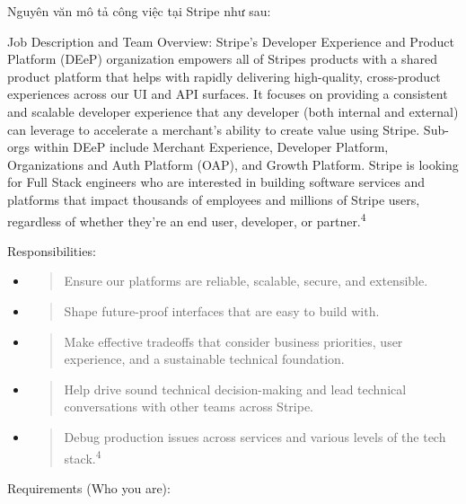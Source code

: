 \documentclass[12pt,a4paper]{article}
\begin{document}
Nguyên văn mô tả công việc tại Stripe như sau:

Job Description and Team Overview: Stripe's Developer Experience and Product Platform (DEeP) organization empowers all of Stripe\textquotesingle s products with a shared product platform that helps with rapidly delivering high-quality, cross-product experiences across our UI and API surfaces. It focuses on providing a consistent and scalable developer experience that any developer (both internal and external) can leverage to accelerate a merchant's ability to create value using Stripe. Sub-orgs within DEeP include Merchant Experience, Developer Platform, Organizations and Auth Platform (OAP), and Growth Platform. Stripe is looking for Full Stack engineers who are interested in building software services and platforms that impact thousands of employees and millions of Stripe users, regardless of whether they're an end user, developer, or partner.\textsuperscript{4}

Responsibilities:

\begin{itemize}
\item
  \begin{quote}
  Ensure our platforms are reliable, scalable, secure, and extensible.
  \end{quote}
\item
  \begin{quote}
  Shape future-proof interfaces that are easy to build with.
  \end{quote}
\item
  \begin{quote}
  Make effective tradeoffs that consider business priorities, user experience, and a sustainable technical foundation.
  \end{quote}
\item
  \begin{quote}
  Help drive sound technical decision-making and lead technical conversations with other teams across Stripe.
  \end{quote}
\item
  \begin{quote}
  Debug production issues across services and various levels of the tech stack.\textsuperscript{4}
  \end{quote}
\end{itemize}

Requirements (Who you are):
\end{document}
